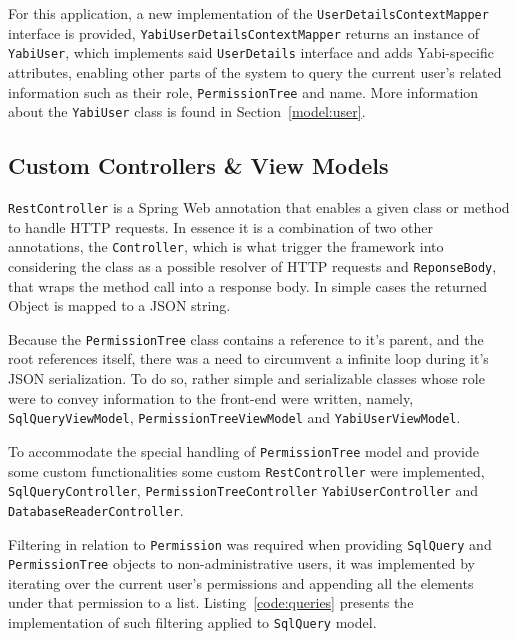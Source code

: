For this application, a new implementation of the \texttt{UserDetailsContextMapper} interface is provided, \texttt{YabiUserDetailsContextMapper} returns an instance of \texttt{YabiUser}, which implements said \texttt{UserDetails} interface and adds \gls{Yabi}-specific attributes, enabling other parts of the system to query the current user's related information such as their role, \texttt{PermissionTree} and name. More information about the \texttt{YabiUser} class is found in Section~\ref{model:user}.

\subsection{Custom Controllers \& View Models}
\texttt{RestController} is a Spring Web annotation that enables a given class or method to handle \gls{HTTP} requests. In essence it is a combination of two other annotations, the \texttt{Controller}, which is what trigger the framework into considering the class as a possible resolver of  \gls{HTTP} requests and \texttt{ReponseBody}, that wraps the method call into a response body. In simple cases the returned Object is mapped to a \gls{JSON} string.

Because the \texttt{PermissionTree} class contains a reference to it's parent, and the root references itself, there was a need to circumvent a infinite loop during it's \gls{JSON} serialization. To do so, rather simple and 
serializable classes whose role were to convey information to the front-end were written, namely, \texttt{SqlQueryViewModel}, \texttt{PermissionTreeViewModel} and \texttt{YabiUserViewModel}.

To accommodate the special handling of \texttt{PermissionTree} model and provide some custom functionalities some custom \texttt{RestController} were implemented, \texttt{SqlQueryController}, \texttt{PermissionTreeController} \texttt{YabiUserController} and \texttt{DatabaseReaderController}.

Filtering in relation to \texttt{Permission} was required when providing \texttt{SqlQuery} and \texttt{PermissionTree} objects to non-administrative users, it was implemented by iterating over the current user's permissions and appending all the elements under that permission to a list. Listing~\ref{code:queries} presents the implementation of such filtering applied to \texttt{SqlQuery} model.




